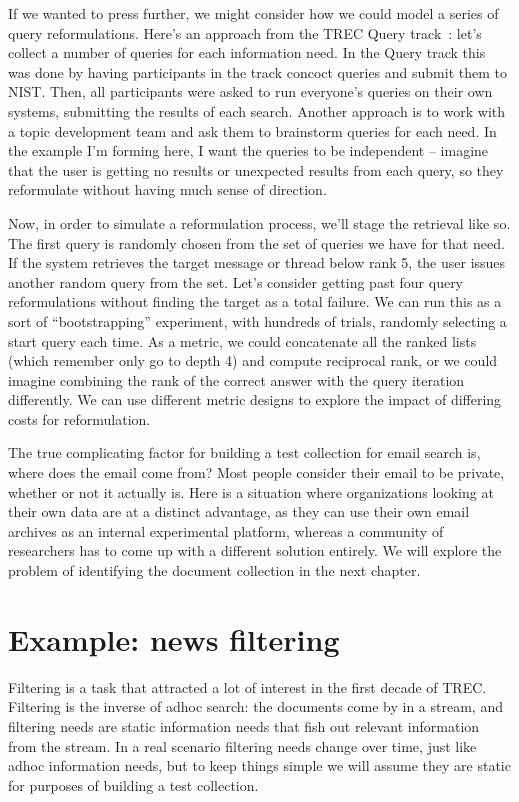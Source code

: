 \documentclass[nobib]{tufte-book}
\begin{document}
If we wanted to press further, we might consider how we could model a series of query reformulations.  Here's an approach from the TREC Query track~\autocite{buckley_query_track_2009}: let's collect a number of queries for each information need.  In the Query track this was done by having participants in the track concoct queries and submit them to NIST.  Then, all participants were asked to run everyone's queries on their own systems, submitting the results of each search. Another approach is to work with a topic development team and ask them to brainstorm queries for each need.  In the example I'm forming here, I want the queries to be independent -- imagine that the user is getting no results or unexpected results from each query, so they reformulate without having much sense of direction.

Now, in order to simulate a reformulation process, we'll stage the retrieval like so.  The first query is randomly chosen from the set of queries we have for that need.  If the system retrieves the target message or thread below rank 5, the user issues another random query from the set.  Let's consider getting past four query reformulations without finding the target as a total failure.  We can run this as a sort of ``bootstrapping'' experiment, with hundreds of trials, randomly selecting a start query each time.  As a metric, we could concatenate all the ranked lists (which remember only go to depth 4) and compute reciprocal rank, or we could imagine combining the rank of the correct answer with the query iteration differently.  We can use different metric designs to explore the impact of differing costs for reformulation.

The true complicating factor for building a test collection for email search is, where does the email come from?  Most people consider their email to be private, whether or not it actually is.  Here is a situation where organizations looking at their own data are at a distinct advantage, as they can use their own email archives as an internal experimental platform, whereas a community of researchers has to come up with a different solution entirely.  We will explore the problem of identifying the document collection in the next chapter.

\section{Example: news filtering}

Filtering is a task that attracted a lot of interest in the first decade of TREC.  Filtering is the inverse of adhoc search: the documents come by in a stream, and filtering needs are static information needs that fish out relevant information from the stream.  In a real scenario filtering needs change over time, just like adhoc information needs, but to keep things simple we will assume they are static for purposes of building a test collection.
\end{document}
